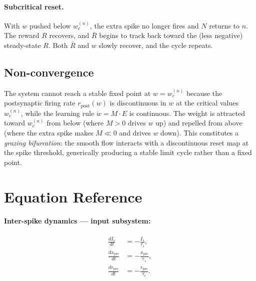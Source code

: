 \documentclass[11pt]{article}
\theoremstyle{plain}
\theoremstyle{definition}
\begin{document}
\paragraph{Subcritical reset.} With $w$ pushed below $w_c^{(n)}$, the extra spike no longer fires and $N$ returns to $n$. The reward $R$ recovers, and $\bar{R}$ begins to track back toward the (less negative) steady-state $R$. Both $\bar{R}$ and $w$ slowly recover, and the cycle repeats.

\subsection{Non-convergence}

The system cannot reach a stable fixed point at $w = w_c^{(n)}$ because the postsynaptic firing rate $r_{\mathrm{post}}(w)$ is discontinuous in $w$ at the critical values $w_c^{(n)}$, while the learning rule $\dot{w} = M \cdot E$ is continuous. The weight is attracted toward $w_c^{(n)}$ from below (where $M > 0$ drives $w$ up) and repelled from above (where the extra spike makes $M \ll 0$ and drives $w$ down). This constitutes a \emph{grazing bifurcation}: the smooth flow interacts with a discontinuous reset map at the spike threshold, generically producing a stable limit cycle rather than a fixed point.

\newpage
\section*{Equation Reference}

\paragraph*{Inter-spike dynamics --- input subsystem:}
\begin{align}
    \frac{dI_s}{dt} &= -\frac{I_s}{\tau_s}, \label{eq:ref_Is} \\[6pt]
    \frac{dx_{\mathrm{pre}}}{dt} &= -\frac{x_{\mathrm{pre}}}{\tau_+}, \label{eq:ref_xpre} \\[6pt]
    \frac{dr_{\mathrm{pre}}}{dt} &= -\frac{r_{\mathrm{pre}}}{\tau_r}. \label{eq:ref_rpre}
\end{align}
\end{document}
